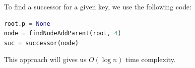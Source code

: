 \documentclass[main.tex]{subfiles}
\begin{document}
To find a successor for a given key, we use the following code:
\begin{lstlisting}[language=Python]
root.p = None
node = findNodeAddParent(root, 4)
suc = successor(node)
\end{lstlisting}
This approach will gives us $O(\log n)$ time complexity. 
  
    

\end{document}
